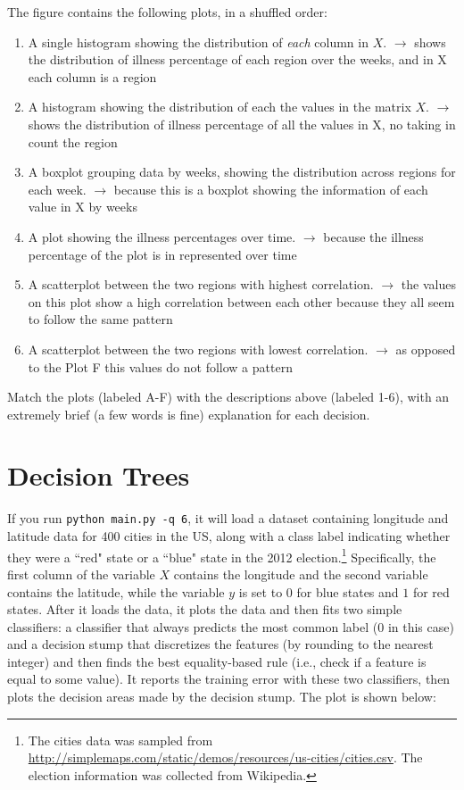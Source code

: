 \documentclass{article}
\def\blu#1{{\color{blu}#1}}
\def\ans#1{{\color{ans}#1}}
\def\enum#1{\begin{enumerate}#1\end{enumerate}}
\begin{document}
The figure contains the following plots, in a shuffled order:
\enum{
\item A single histogram showing the distribution of \emph{each} column in $X$. \ans{\fbox{Plot D} $\rightarrow$ shows the distribution of illness percentage of each region over the weeks, and in X each column is a region }
\item A histogram showing the distribution of each the values in the matrix $X$. \ans{\fbox{Plot C} $\rightarrow$ shows the distribution of illness percentage of all the values in X, no taking in count the region }
\item A boxplot grouping data by weeks, showing the distribution across regions for each week. \ans{\fbox{Plot B} $\rightarrow$ because this is a boxplot showing the information of each value in X by weeks}
\item A plot showing the illness percentages over time. \ans{\fbox{Plot A} $\rightarrow$ because the illness percentage of the plot is in represented over time}
\item A scatterplot between the two regions with highest correlation. \ans{\fbox{Plot F} $\rightarrow$ the values on this plot show a high correlation between each other because they all seem to follow the same pattern}
\item A scatterplot between the two regions with lowest correlation. \ans{\fbox{Plot E} $\rightarrow$  as opposed to the Plot F this values do not follow a pattern}
}

\blu{Match the plots (labeled A-F) with the descriptions above (labeled 1-6), with an extremely brief (a few words is fine) explanation for each decision.}



\section{Decision Trees}

If you run \texttt{python main.py -q 6}, it will load a dataset containing longitude 
and latitude data for 400 cities in the US, along with a class label indicating
 whether they were a ``red" state or a ``blue" state in the 2012 
 election.\footnote{The cities data was sampled from \url{http://simplemaps.com/static/demos/resources/us-cities/cities.csv}. The election information was collected from Wikipedia.}
Specifically, the first column of the variable $X$ contains the 
longitude and the second variable contains the latitude,
while the variable $y$ is set to $0$ for blue states and $1$ for red states.
After it loads the data, it plots the data and then fits two simple 
classifiers: a classifier that always predicts the
most common label ($0$ in this case) and a decision stump
that discretizes the features (by rounding to the nearest integer)
and then finds the best equality-based rule (i.e., check
 if a feature is equal to some value).
It reports the training error with these two classifiers, then plots the decision areas made by the decision stump.
The plot is shown below:
\end{document}
